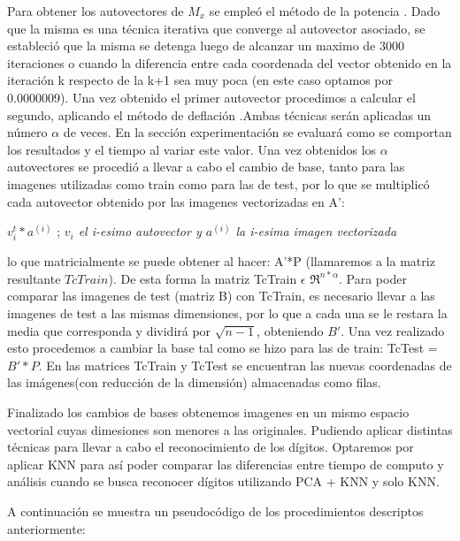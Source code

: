  Para obtener los autovectores de $M_x$ se empleó el método de la potencia %
. Dado que la misma es una técnica iterativa que converge al autovector asociado, se estableció que la misma se detenga luego de alcanzar un maximo de 3000 iteraciones o cuando la diferencia entre cada coordenada del vector obtenido en la iteración k respecto de la k+1 sea muy poca (en este caso optamos por 0.0000009). Una vez obtenido el primer autovector procedimos a calcular el segundo, aplicando el método de deflación %
.Ambas técnicas serán aplicadas un número $\alpha$ de veces. En la sección experimentación se evaluará como se comportan los resultados y el tiempo al variar este valor.
Una vez obtenidos los $\alpha$ autovectores se procedió a llevar a cabo el cambio de base, tanto para las imagenes utilizadas como train como para las de test, por lo que se multiplicó cada autovector obtenido por las imagenes vectorizadas en A': \newline

$v_i^{t}*a^{(i)}$ ; \textit{$v_i$ el i-esimo autovector y $a^{(i)}$ la i-esima imagen vectorizada} \newline

lo que matricialmente se puede obtener al hacer: A'*P (llamaremos a la matriz resultante $TcTrain$). De esta forma la matriz TcTrain $\epsilon$ $\Re^{n*\alpha}$. Para poder comparar las imagenes de test (matriz B) con TcTrain, es necesario llevar a las imagenes de test a las mismas dimensiones, por lo que a cada una se le restara la media que corresponda y dividirá por $\sqrt{n-1}$, obteniendo $ B'$. 
Una vez realizado esto procedemos a cambiar la base tal como se hizo para las de train:\newline
 TcTest = $B'*P$. En las matrices TcTrain y TcTest se encuentran las nuevas coordenadas de las imágenes(con reducción de la dimensión) almacenadas como filas.
 

 Finalizado los cambios de bases obtenemos imagenes en un mismo espacio vectorial cuyas dimesiones son menores a las originales. Pudiendo aplicar distintas técnicas para llevar a cabo el reconocimiento de los dígitos. Optaremos por aplicar KNN para así poder comparar las diferencias entre tiempo de computo y análisis cuando se busca reconocer dígitos utilizando PCA + KNN y solo KNN.
 
A continuación se muestra un pseudocódigo de los procedimientos descriptos anteriormente:

